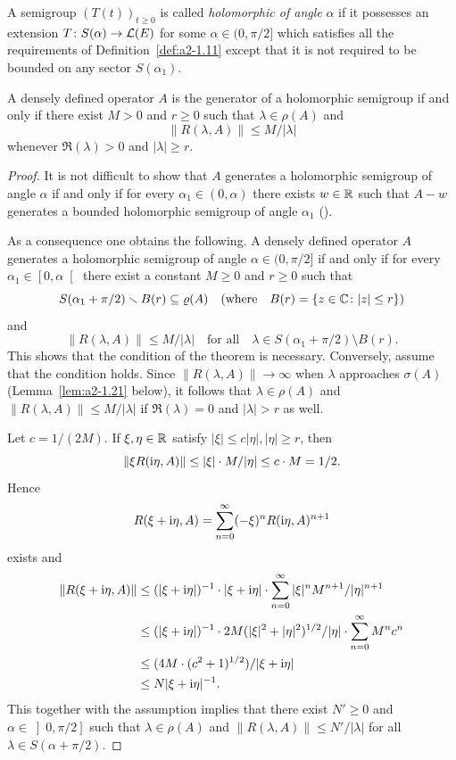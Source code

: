 A semigroup $(T(t))_{t \geq 0}$ is called \emph{holomorphic of angle} $\alpha$ if it possesses an extension $T \colon S(\alpha) \to \mathcal{L}(E)$ for some $\alpha \in (0,\pi/2]$ which satisfies all the requirements of Definition~\ref{def:a2-1.11} except that it is not required to be bounded on any sector $S(\alpha_{1})$.
\begin{theorem}\label{thm:a2-1.14}
A densely defined operator $A$ is the generator of a holomorphic semigroup if and only if there exist $M > 0$ and $r \geq 0$ such that $\lambda \in \rho(A)$ and 
%
\[
	\|R(\lambda,A)\| \leq M/|\lambda| 
\]
%
whenever $\Re(\lambda) > 0$ and $|\lambda| \geq r$.
\end{theorem}
\begin{proof}
It is not difficult to show that $A$ generates a holomorphic semigroup of angle $\alpha$ if and only if for every $\alpha_{1} \in (0,\alpha)$ there exists $w \in \mathbb{R}$ such that $A - w$ generates a bounded holomorphic semigroup of angle $\alpha_{1}$ (\cf \textcite[p.252]{reedsimon:1978}).

As a consequence one obtains the following.
A densely defined operator $A$ generates a holomorphic semigroup of angle $\alpha \in (0,\pi/2]$ if and only if for every $\alpha_{1} \in \left[0,\alpha\right[$ there exist a constant $M \geq 0$ and $r \geq 0$ such that 
\[
S(\alpha_{1} + \pi/2) \setminus B(r) \subseteq \rho(A) \quad (\text{where} \quad B(r) = \{z \in \C \colon |z| \leq r\})
\]
and
\[
\|R(\lambda,A)\| \leq M/|\lambda|  \quad \text{for all}  \quad \lambda \in S(\alpha_{1}+\pi/2) \setminus B(r).
\]
This shows that the condition of the theorem is necessary.
Conversely, assume that the condition holds.
Since $\|R(\lambda,A)\| \to \infty$ when $\lambda$ approaches $\sigma(A)$ (\cf Lemma~\ref{lem:a2-1.21}   below), 
it follows that $\lambda \in \rho(A)$ and $\|R(\lambda,A)\| \leq M/|\lambda|$ if\/ $\Re(\lambda) = 0$ and $|\lambda| > r$ as well.

Let $c = 1/(2M)$.
If\/ $\xi, \eta \in \mathbb{R}$ satisfy $|\xi| \leq c|\eta|, |\eta| \geq r$, 
then 
\[
\|\xi R(\im\eta,A)\| \leq |\xi| \cdot M/|\eta| \leq c \cdot M = 1/2.
\]
Hence 
%
\[
	R(\xi+\mathrm{i}\eta,A) = \sum_{n=0}^\infty (-\xi)^{n}R(\mathrm{i}\eta,A)^{n+1} 
\]
%
exists and 
\begin{align*}
    \|R(\xi+\im\eta,A)\| &\leq 
    (|\xi + \im\eta|)^{-1} \cdot |\xi + \im\eta| \cdot \sum_{n=0}^\infty |\xi|^{n}M^{n+1}/|\eta|^{n+1}\\
    &\leq  (|\xi + \im\eta|)^{-1} \cdot 2M (|\xi|^{2} + |\eta|^{2})^{1/2} / |\eta| \cdot \sum_{n=0}^\infty M^{n}c^{n}\\   
    &\leq  (4M\cdot(c^{2}+1)^{1/2})/|\xi+\im\eta| \\
    &\leq N |\xi+\im\eta|^{-1}  . 
\end{align*}
This together with the assumption implies that there exist $N' \geq 0$ and $\alpha \in \left]0,\pi/2\right]$ such that $\lambda \in \rho(A)$ and $\|R(\lambda,A)\| \leq N'/|\lambda|$ for all $\lambda \in S(\alpha+\pi/2)$.
\end{proof}

